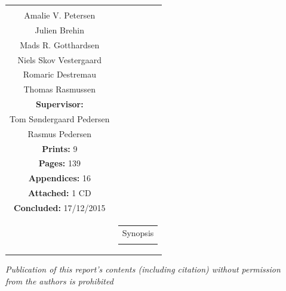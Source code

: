 \begin{titlepage}
\begin{nopagebreak}
{\begin{tabular}{cc}
{{\textbf{Participants:}\\
Amalie V. Petersen\\
Julien Brehin\\
Mads R. Gotthardsen\\
Niels Skov Vestergaard\\
Romaric Destremau\\
Thomas Rasmussen\\

\textbf{Supervisor:}\\
Tom Søndergaard Pedersen\\ %
Rasmus Pedersen
}\\

\textbf{Prints:} 9\\ %
\textbf{Pages:} 139\\ %
\textbf{Appendices:} 16\\ %
\textbf{Attached:} 1 CD\\
\textbf{Concluded:} 17/12/2015\\

\vfill } &
\parbox{7cm}{
  \vspace{.15cm}
  \hfill 
  \begin{tabular}{l}
  {Synopsis}\bigskip \\
  \fbox{
    \parbox{6.5cm}{\bigskip
     {\vfill{\small 
     \bigskip}}
     }}
   \end{tabular}}
\end{tabular}} %

\textit{\phantom{A}Publication of this report's contents (including citation) without permission\\ \phantom{A}from the authors is prohibited}\\

\end{nopagebreak}
\end{titlepage}
%